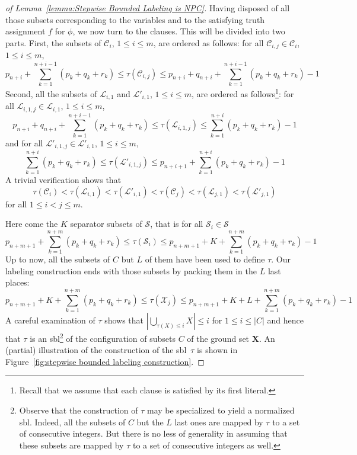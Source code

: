 \documentclass[a4paper,10pt]{llncs}
\newcommand{\SBL}{sbl}
\begin{document}
\begin{proof}[of Lemma~\ref{lemma:Stepwise Bounded Labeling is NPC}]
  Having disposed of all those subsets corresponding to the variables and to the satisfying truth assignment $f$ for $\phi$, we now turn to the clauses. This will be divided into two parts. First, the subsets of $\mathcal{C}_i$, $1 \leq i \leq m$, are ordered as follows: for all $\mathcal{C}_{i, j} \in \mathcal{C}_i$, $1 \leq i \leq m$,
  $$
  p_{n+i} + \sum_{k = 1}^{n+i-1} (p_k + q_k + r_k) \leq \tau(\mathcal{C}_{i, j}) \leq p_{n+i} + q_{n+i} + \sum_{k = 1}^{n+i-1} (p_k + q_k + r_k) - 1
  $$
  Second, all the subsets of $\mathcal{L}_{i, 1}$ and $\mathcal{L}'_{i, 1}$, $1 \leq i \leq m$, are ordered as follows\footnote{Recall that we assume that each clause is satisfied by its first literal.}: for all $\mathcal{L}_{i, 1, j} \in \mathcal{L}_{i, 1}$, $1 \leq i \leq m$,
  $$
  p_{n+i} + q_{n+i} + \sum_{k = 1}^{n+i-1} (p_k + q_k + r_k) \leq \tau(\mathcal{L}_{i, 1, j}) \leq \sum_{k = 1}^{n+i} (p_k + q_k + r_k) - 1
  $$
  and for all $\mathcal{L}'_{i, 1, j} \in \mathcal{L}'_{i, 1}$, $1 \leq i \leq m$,
  $$
  \sum_{k = 1}^{n+i} (p_k + q_k + r_k) \leq \tau(\mathcal{L}'_{i, 1, j}) \leq p_{n+i+1} + \sum_{k = 1}^{n+i} (p_k + q_k + r_k) - 1
  $$
  A trivial verification shows that
  $$
  \tau(\mathcal{C}_i) < \tau(\mathcal{L}_{i,1}) < \tau(\mathcal{L}'_{i, 1}) < \tau(\mathcal{C}_j) < \tau(\mathcal{L}_{j,1}) < \tau(\mathcal{L}'_{j, 1})
  $$
  for all $1 \leq i < j \leq m$.

  Here come the $K$ separator subsets of $\mathcal{S}$, that is for all $\mathcal{S}_i \in \mathcal{S}$
  $$
  p_{n+m+1} + \sum_{k = 1}^{n+m} (p_k + q_k + r_k) \leq \tau(\mathcal{S}_i) \leq p_{n+m+1} + K + \sum_{k = 1}^{n+m} (p_k + q_k + r_k) - 1
  $$
  Up to now, all the subsets of $C$ but $L$ of them have been used to define $\tau$. Our labeling construction ends with those subsets by packing them in the $L$ last places:
  $$
  p_{n+m+1} + K + \sum_{k = 1}^{n+m} (p_k + q_k + r_k) \leq \tau(\mathcal{X}_j) \leq p_{n+m+1} + K + L + \sum_{k = 1}^{n+m} (p_k + q_k + r_k) - 1
  $$
  A careful examination of $\tau$ shows that $\left| \bigcup_{\tau(X)
    \leq i} X \right| \leq i$ for $1 \leq i \leq |C|$ and hence that
  $\tau$ is an \SBL\footnote{Observe that the construction of $\tau$
    may be specialized to yield a normalized \SBL. Indeed, all the subsets of $C$ but the $L$ last ones are
    mapped by $\tau$ to a set of consecutive integers. But there is no
    less of generality in assuming that these subsets are mapped by
    $\tau$ to a set of consecutive integers as well.} of the
  configuration of subsets $C$ of the ground set $\mathbf{X}$. An
  (partial) illustration of the construction of the \SBL\ $\tau$ is shown in Figure~\ref{fig:stepwise bounded
    labeling construction}. 


\end{proof}
\end{document}
